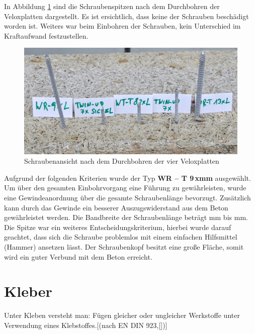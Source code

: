 In Abbildung \ref{Schraubenauswertung} sind die Schraubenspitzen nach dem Durchbohren der Veloxplatten dargestellt. Es ist ersichtlich, dass keine der Schrauben beschädigt worden ist. Weiters war beim Einbohren der Schrauben, kein Unterschied im Kraftaufwand festzustellen. \newline

\begin{figure}[h!]
\begin{center}
\includegraphics[scale =0.8]{Verbindungsmittel/schrauben/Schraubenauswertung.png}
\caption{ Schraubenansicht nach dem Durchbohren der vier Veloxplatten}
\label{Schraubenauswertung}
\end{center}
\end{figure}


Aufgrund der folgenden Kriterien wurde der Typ \textbf{WR – T 9\,x\unit[400]{mm}} ausgewählt.
Um über den gesamten Einbohrvorgang eine Führung zu gewährleisten, wurde eine Gewindeanordnung über die gesamte Schraubenlänge bevorzugt. Zusätzlich kann durch das Gewinde ein besserer Auszugswiderstand aus dem Beton gewährleistet werden. Die Bandbreite der Schraubenlänge beträgt \unit[250]{mm} bis \unit[1000]{mm}.
Die Spitze war ein weiteres Entscheidungskriterium, hierbei wurde darauf geachtet, dass sich die Schraube problemlos mit einem einfachen Hilfsmittel (Hammer) ansetzen lässt. 
Der Schraubenkopf besitzt eine große Fläche, somit wird ein guter  Verbund mit dem Beton erreicht. 





\section{Kleber}
Unter Kleben versteht man: Fügen gleicher oder ungleicher Werkstoffe unter Verwendung eines Klebstoffes.[(nach EN DIN 923,[])] 


